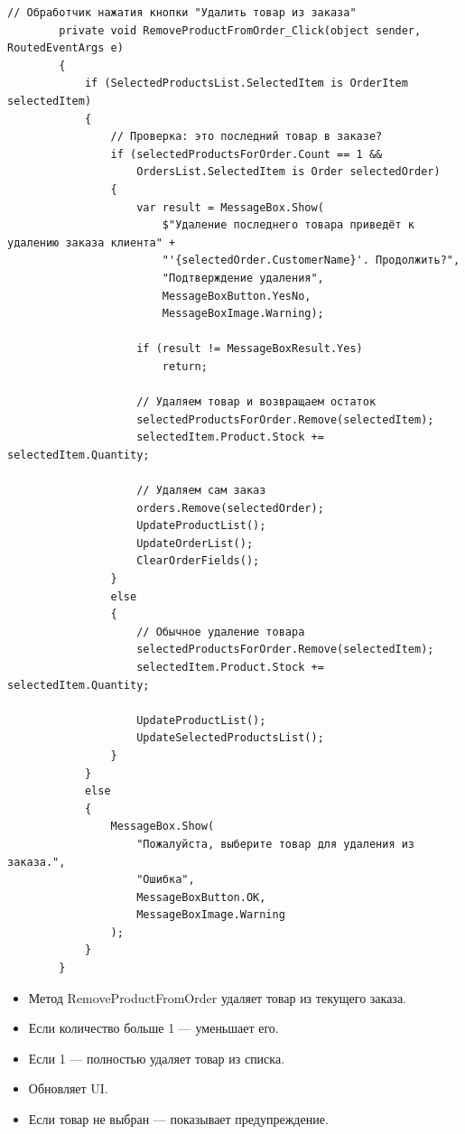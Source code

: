 \documentclass[12pt]{article}
\newcommand{\colorGIT}[1]{\textcolor{CtpGreen}{#1}}
\begin{document}
\begin{lstlisting}[style=csharp_catppuccin, caption=\colorGIT{\href{https://github.com/WebMasterIT/Csharp_Labs/blob/ec375afd16c0647b337cf3d8a79c8bef904fc1be/3lab/StoreManager/MainWindow.xaml.cs\#L297-L338}{Метод}} удаления товара из заказа, label=lst:MethodDelete3]
        // Обработчик нажатия кнопки "Удалить товар из заказа"
        private void RemoveProductFromOrder_Click(object sender, RoutedEventArgs e)
        {
            if (SelectedProductsList.SelectedItem is OrderItem selectedItem)
            {
                // Проверка: это последний товар в заказе?
                if (selectedProductsForOrder.Count == 1 && 
                    OrdersList.SelectedItem is Order selectedOrder)
                {
                    var result = MessageBox.Show(
                        $"Удаление последнего товара приведёт к удалению заказа клиента" + 
                        "'{selectedOrder.CustomerName}'. Продолжить?",
                        "Подтверждение удаления",
                        MessageBoxButton.YesNo,
                        MessageBoxImage.Warning);

                    if (result != MessageBoxResult.Yes)
                        return;

                    // Удаляем товар и возвращаем остаток
                    selectedProductsForOrder.Remove(selectedItem);
                    selectedItem.Product.Stock += selectedItem.Quantity;

                    // Удаляем сам заказ
                    orders.Remove(selectedOrder);
                    UpdateProductList();
                    UpdateOrderList();
                    ClearOrderFields();
                }
                else
                {
                    // Обычное удаление товара
                    selectedProductsForOrder.Remove(selectedItem);
                    selectedItem.Product.Stock += selectedItem.Quantity;

                    UpdateProductList();
                    UpdateSelectedProductsList();
                }
            }
            else
            {
                MessageBox.Show(
                    "Пожалуйста, выберите товар для удаления из заказа.", 
                    "Ошибка", 
                    MessageBoxButton.OK, 
                    MessageBoxImage.Warning
                );
            }
        }
\end{lstlisting}


\begin{itemize}
	\item Метод RemoveProductFromOrder удаляет товар из текущего заказа.
	\item Если количество больше 1 — уменьшает его.
	\item Если 1 — полностью удаляет товар из списка.
	\item Обновляет UI.
	\item Если товар не выбран — показывает предупреждение.
\end{itemize}
\end{document}
